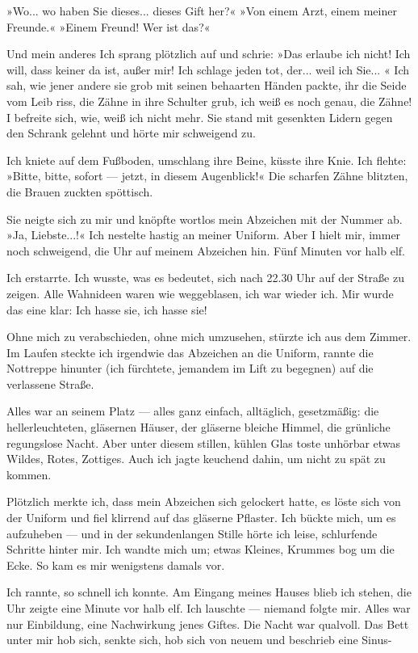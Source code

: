 »Wo... wo haben Sie dieses... dieses Gift her?« »Von einem Arzt,
einem meiner Freunde.« »Einem Freund! Wer ist das?«

Und mein anderes Ich sprang plötzlich auf und schrie: »Das erlaube
ich nicht! Ich will, dass keiner da ist, außer mir! Ich schlage
jeden tot, der... weil ich Sie... « Ich sah, wie jener andere sie
grob mit seinen behaarten Händen packte, ihr die Seide vom Leib
riss, die Zähne in ihre Schulter grub, ich weiß es noch genau, die
Zähne! I befreite sich, wie, weiß ich nicht mehr. Sie stand mit
gesenkten Lidern gegen den Schrank gelehnt und hörte mir schweigend
zu.

Ich kniete auf dem Fußboden, umschlang ihre Beine, küsste ihre
Knie. Ich flehte: »Bitte, bitte, sofort — jetzt, in diesem
Augenblick!« Die scharfen Zähne blitzten, die Brauen zuckten
spöttisch.

Sie neigte sich zu mir und knöpfte wortlos mein Abzeichen mit der
Nummer ab. »Ja, Liebste...!« Ich nestelte hastig an meiner Uniform.
Aber I hielt mir, immer noch schweigend, die Uhr auf meinem
Abzeichen hin. Fünf Minuten vor halb elf.

Ich erstarrte. Ich wusste, was es bedeutet, sich nach 22.30 Uhr auf
der Straße zu zeigen. Alle Wahnideen waren wie weggeblasen, ich war
wieder ich. Mir wurde das eine klar: Ich hasse sie, ich hasse sie!

Ohne mich zu verabschieden, ohne mich umzusehen, stürzte ich aus
dem Zimmer. Im Laufen steckte ich irgendwie das Abzeichen an die
Uniform, rannte die Nottreppe hinunter (ich fürchtete, jemandem im
Lift zu begegnen) auf die verlassene Straße.

Alles war an seinem Platz — alles ganz einfach, alltäglich,
gesetzmäßig: die hellerleuchteten, gläsernen Häuser, der gläserne
bleiche Himmel, die grünliche regungslose Nacht. Aber unter diesem
stillen, kühlen Glas toste unhörbar etwas Wildes, Rotes, Zottiges.
Auch ich jagte keuchend dahin, um nicht zu spät zu kommen.

Plötzlich merkte ich, dass mein Abzeichen sich gelockert hatte, es
löste sich von der Uniform und fiel klirrend auf das gläserne
Pflaster. Ich bückte mich, um es aufzuheben — und in der
sekundenlangen Stille hörte ich leise, schlurfende Schritte hinter
mir. Ich wandte mich um; etwas Kleines, Krummes bog um die Ecke. So
kam es mir wenigstens damals vor.

Ich rannte, so schnell ich konnte. Am Eingang meines Hauses blieb
ich stehen, die Uhr zeigte eine Minute vor halb elf. Ich lauschte —
niemand folgte mir. Alles war nur Einbildung, eine Nachwirkung
jenes Giftes. Die Nacht war qualvoll. Das Bett unter mir hob sich,
senkte sich, hob sich von neuem und beschrieb eine Sinus-

